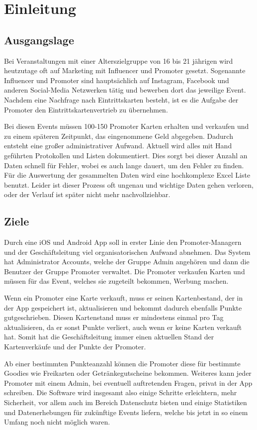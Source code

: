 \chapter{Einleitung}
\section{Ausgangslage}
Bei Veranstaltungen mit einer Alterszielgruppe von 16 bis 21 jährigen wird heutzutage oft auf Marketing mit Influencer und Promoter gesetzt. 
Sogenannte Influencer und Promoter sind hauptsächlich auf Instagram, Facebook und anderen Social-Media Netzwerken tätig und bewerben dort das jeweilige Event. 
Nachdem eine Nachfrage nach Eintrittskarten besteht, ist es die Aufgabe der Promoter den Eintrittskartenvertrieb zu übernehmen. 

Bei diesen Events müssen 100-150 Promoter Karten erhalten und verkaufen und zu einem späteren Zeitpunkt, das eingenommene Geld abgegeben. Dadurch entsteht eine großer 
administrativer Aufwand. Aktuell wird alles mit Hand geführten Protokollen und Listen dokumentiert.
Dies sorgt bei dieser Anzahl an Daten schnell für Fehler, wobei es auch lange dauert, um den Fehler zu finden.
Für die Auswertung der gesammelten Daten wird eine hochkomplexe Excel Liste benutzt. Leider ist dieser Prozess oft ungenau und wichtige 
Daten gehen verloren, oder der Verlauf ist später nicht mehr nachvollziehbar. 

\section{Ziele}
Durch eine iOS und Android App soll in erster Linie den Promoter-Managern und der Geschäftsleitung viel organisatorischen Aufwand abnehmen. 
Das System hat Administrator Accounts,  welche der Gruppe Admin angehören und dann die Benutzer der Gruppe Promoter verwaltet.
Die Promoter verkaufen Karten und müssen für das Event, welches sie zugeteilt bekommen, Werbung machen.

Wenn ein Promoter eine Karte verkauft, muss er seinen Kartenbestand, der in der App gespeichert ist, aktualisieren und bekommt dadurch ebenfalls Punkte gutgeschrieben.
Diesen Kartenstand muss er mindestens einmal pro Tag aktualisieren, da er sonst Punkte verliert, auch wenn er keine Karten verkauft hat.
Somit hat die Geschäftsleitung immer einen aktuellen Stand der Kartenverkäufe und der Punkte der Promoter.

Ab einer bestimmten Punkteanzahl können die Promoter diese für bestimmte Goodies wie Freikarten oder Getränkegutscheine bekommen.
Weiteres kann jeder Promoter mit einem Admin, bei eventuell auftretenden Fragen, privat in der App schreiben.
Die Software wird insgesamt also einige Schritte erleichtern, mehr Sicherheit, vor allem auch im Bereich Datenschutz bieten und einige Statistiken und Datenerhebungen für zukünftige Events liefern,
welche bis jetzt in so einem Umfang noch nicht möglich waren.

